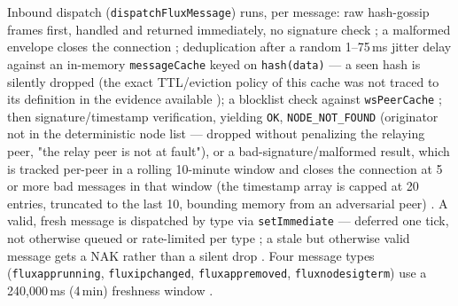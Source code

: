 Inbound dispatch (\texttt{dispatch\allowbreak{}Flux\allowbreak{}Message}) runs, per message: raw hash-gossip frames first,
handled and returned immediately, no signature check
; a malformed envelope closes the
connection ; deduplication after
a random 1--75\,ms jitter delay against an in-memory \texttt{messageCache} keyed on
\texttt{hash(data)} — a seen hash is silently dropped
 (the exact TTL/eviction policy
of this cache was not traced to its definition in the evidence available \srcinferred); a blocklist
check against \texttt{wsPeerCache}
; then signature/timestamp
verification, yielding \texttt{OK}, \texttt{NODE\_NOT\_FOUND} (originator not in the deterministic
node list — dropped without penalizing the relaying peer, "the relay peer is not at fault"), or a
bad-signature/malformed result, which is tracked per-peer in a rolling 10-minute window and closes
the connection at 5 or more bad messages in that window (the timestamp array is capped at 20
entries, truncated to the last 10, bounding memory from an adversarial peer)
. A valid, fresh message is
dispatched by type via \texttt{setImmediate} — deferred one tick, not otherwise queued or
rate-limited per type ; a stale
but otherwise valid message gets a NAK rather than a silent drop
. Four message types
(\texttt{fluxapprunning}, \texttt{fluxipchanged}, \texttt{fluxappremoved}, \texttt{fluxnodesigterm}) use a 240{,}000\,ms
(4\,min) freshness window .

